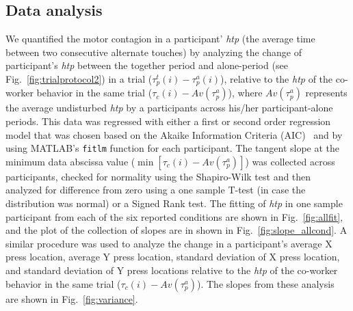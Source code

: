 \documentclass[a4paper, 12pt, oneside]{Thesis}  %
\begin{document}
\subsection{Data analysis} \label{data_analysis}

We quantified the motor contagion in a participant' {\it htp} (the average time between two consecutive alternate touches) by analyzing the change of participant's {\it htp} between the together period and alone-period (see Fig.~\ref{fig:trialprotocol2}) in a trial ($\tau_p^t(i)-\tau_p^a(i)$), relative to the {\it htp} of the co-worker behavior in the same trial ($\tau_c (i)-Av(\tau_p^a)$), where $Av(\tau_p^a)$ represents the average undisturbed {\it htp} by a participants across his/her participant-alone periods. This data was regressed with either a first or second order regression model that was chosen based on the Akaike Information Criteria (AIC)~\cite{Akaike:ISIT:1973} and by using MATLAB's {\tt fitlm} function for each participant. The tangent slope at the minimum data abscissa value ($\min[\tau_c(i)-Av(\tau_p^a)]$) was collected across participants, checked for normality using the Shapiro-Wilk test and then analyzed for difference from zero using a one sample T-test (in case the distribution was normal) or a Signed Rank test. The fitting of {\it htp} in one sample participant from each of the six reported conditions are shown in Fig.~\ref{fig:allfit}, and the plot of the collection of slopes are in shown in Fig.~\ref{fig:slope_allcond}. A similar procedure was used to analyze the change in a participant's average X press location, average Y press location, standard deviation of X press location, and standard deviation of Y press locations relative to the {\it htp} of the co-worker behavior in the same trial ($\tau_c(i)-Av(\tau_p^a)$). The slopes from these analysis are shown in Fig.~\ref{fig:variance}.
\end{document}
